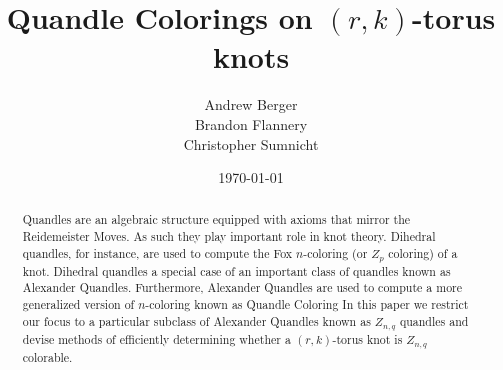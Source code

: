 \documentclass[11pt]{article}
\title{Quandle Colorings on $(r,k)$-torus knots}
\author{
        Andrew Berger \\
	Brandon Flannery \\
	Christopher Sumnicht \\
}
\date{\today}
\theoremstyle{plain}
\theoremstyle{definition}
\begin{document}
\maketitle
\begin{abstract}
	Quandles are an algebraic structure equipped with axioms that mirror the Reidemeister Moves. As such they play important role in knot theory. Dihedral quandles, for instance, are used to compute the Fox $n$-coloring (or $Z_p$ coloring) of a knot. Dihedral quandles a special case of an important class of quandles known as Alexander Quandles. Furthermore, Alexander Quandles are used to compute a more generalized version of $n$-coloring known as Quandle Coloring
        In this paper we restrict our focus to a particular subclass of Alexander Quandles known as $Z_{n,q}$ quandles and  devise methods of efficiently determining whether a $(r,k)$-torus knot is $Z_{n,q}$ colorable.
\end{abstract}

\clearpage
\tableofcontents
\clearpage










\end{document}
